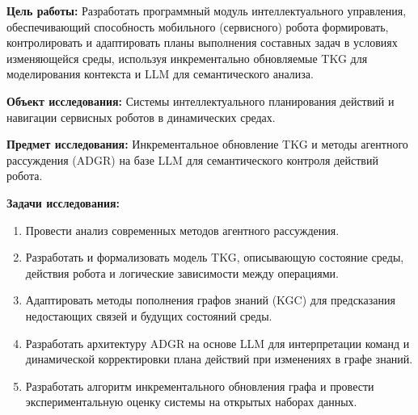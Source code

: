 \textbf{Цель работы:} Разработать программный модуль интеллектуального управления, обеспечивающий способность мобильного (сервисного) робота формировать, контролировать и адаптировать планы выполнения составных задач в условиях изменяющейся среды, используя инкрементально обновляемые TKG для моделирования контекста и LLM для семантического анализа.

\textbf{Объект исследования:} Системы интеллектуального планирования действий и навигации сервисных роботов в динамических средах.

\textbf{Предмет исследования:} Инкрементальное обновление TKG и методы агентного рассуждения (ADGR) на базе LLM для семантического контроля действий робота.

\textbf{Задачи исследования:}
\begin{enumerate}
    \item Провести анализ современных методов агентного рассуждения.
    \item Разработать и формализовать модель TKG, описывающую состояние среды, действия робота и логические зависимости между операциями.
    \item Адаптировать методы пополнения графов знаний (KGC) для предсказания недостающих связей и будущих состояний среды.
    \item Разработать архитектуру ADGR на основе LLM для интерпретации команд и динамической корректировки плана действий при изменениях в графе знаний.
    \item Разработать алгоритм инкрементального обновления графа и провести экспериментальную оценку системы на открытых наборах данных.
\end{enumerate}
